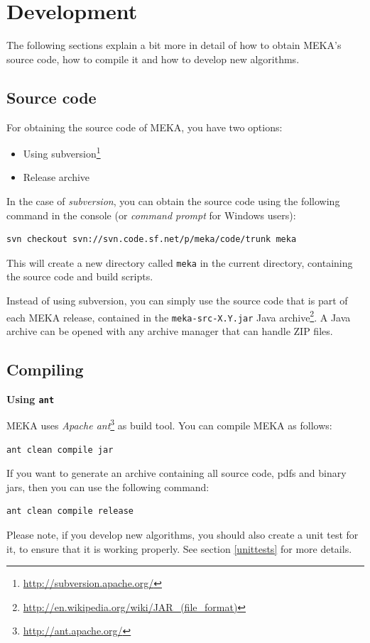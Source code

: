 \documentclass[11pt]{article}
\newcommand{\heading}[1]{
    \vspace{0.3cm} \noindent \textbf{#1} \newline
}
\begin{document}

\section{Development}
\label{development}
The following sections explain a bit more in detail of how to obtain MEKA's source code, how to compile it and how to develop new algorithms.

\subsection{Source code}
\label{sourcecode}
For obtaining the source code of MEKA, you have two options:
\begin{itemize}
  \item Using subversion\footnote{\url{http://subversion.apache.org/}}
  \item Release archive
\end{itemize}

\noindent In the case of \textit{subversion}, you can obtain the source code using the following command in the console (or \textit{command prompt} for Windows users):
\begin{lstlisting}
svn checkout svn://svn.code.sf.net/p/meka/code/trunk meka
\end{lstlisting}
This will create a new directory called \texttt{meka} in the current directory, containing the source code and build scripts.

Instead of using subversion, you can simply use the source code that is part of each MEKA release, contained in the \texttt{meka-src-X.Y.jar} Java archive\footnote{\url{http://en.wikipedia.org/wiki/JAR\_(file\_format)}}. A Java archive can be opened with any archive manager that can handle ZIP files.

\subsection{Compiling}
\label{compiling}
\heading{Using \texttt{ant}}
MEKA uses \textit{Apache ant}\footnote{\url{http://ant.apache.org/}} as build tool. You can compile MEKA as follows:
\begin{lstlisting}
ant clean compile jar
\end{lstlisting}
If you want to generate an archive containing all source code, pdfs and binary jars, then you can use the following command:
\begin{lstlisting}
ant clean compile release
\end{lstlisting}
Please note, if you develop new algorithms, you should also create a unit test for it, to ensure that it is working properly. See section \ref{unittests} for more details.
\end{document}
